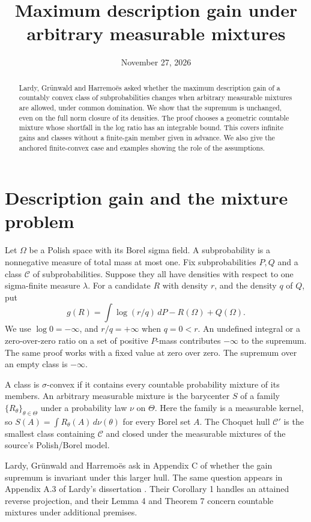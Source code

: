 \documentclass[11pt,a4paper]{amsart}
\title[Maximum description gain under measurable mixtures]{Maximum description gain under\texorpdfstring{\\}{ }arbitrary measurable mixtures}
\date{November 27, 2026}
\begin{document}
\begin{abstract}
Lardy, Gr\"unwald and Harremo\"es asked whether the maximum description gain of a countably convex class of subprobabilities changes when arbitrary measurable mixtures are allowed, under common domination. We show that the supremum is unchanged, even on the full norm closure of its densities. The proof chooses a geometric countable mixture whose shortfall in the log ratio has an integrable bound. This covers infinite gains and classes without a finite-gain member given in advance. We also give the anchored finite-convex case and examples showing the role of the assumptions.
\end{abstract}
\maketitle

\section{Description gain and the mixture problem}

Let \(\Omega\) be a Polish space with its Borel sigma field. A subprobability is a nonnegative measure of total mass at most one. Fix subprobabilities \(P,Q\) and a class \(\mathcal C\) of subprobabilities. Suppose they all have densities with respect to one sigma-finite measure \(\lambda\). For a candidate \(R\) with density \(r\), and the density \(q\) of \(Q\), put
\begin{equation}\label{eq:gain}
 g(R)=\int\log(r/q)\,dP-R(\Omega)+Q(\Omega).
\end{equation}
We use \(\log 0=-\infty\), and \(r/q=+\infty\) when \(q=0<r\). An undefined integral or a zero-over-zero ratio on a set of positive \(P\)-mass contributes \(-\infty\) to the supremum. The same proof works with a fixed value at zero over zero. The supremum over an empty class is \(-\infty\).

A class is \(\sigma\)-convex if it contains every countable probability mixture of its members. An arbitrary measurable mixture is the barycenter \(S\) of a family \(\{R_\theta\}_{\theta\in\Theta}\) under a probability law \(\nu\) on \(\Theta\). Here the family is a measurable kernel, so \(S(A)=\int R_\theta(A)\,d\nu(\theta)\) for every Borel set \(A\). The Choquet hull \(\mathcal C'\) is the smallest class containing \(\mathcal C\) and closed under the measurable mixtures of the source's Polish/Borel model.

Lardy, Gr\"unwald and Harremo\"es ask in Appendix C of \cite{lgh} whether the gain supremum is invariant under this larger hull. The same question appears in Appendix A.3 of Lardy's dissertation \cite{thesis}. Their Corollary 1 handles an attained reverse projection, and their Lemma 4 and Theorem 7 concern countable mixtures under additional premises.
\end{document}
